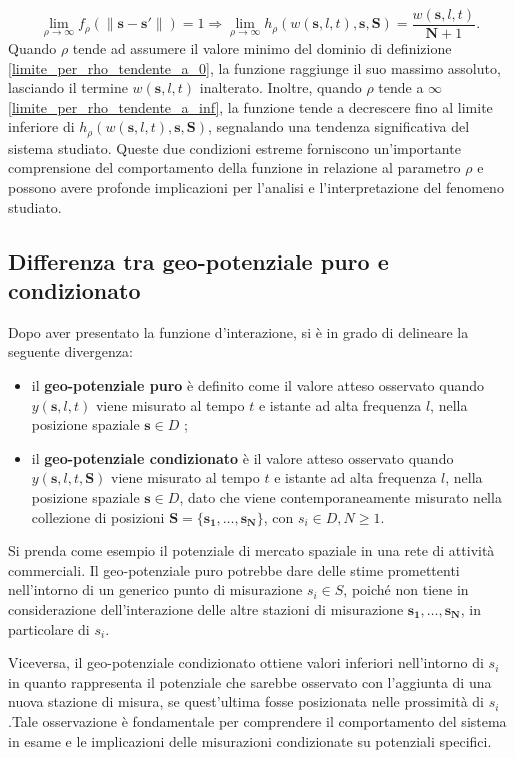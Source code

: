 \begin{equation}
	\lim_{\rho \to \infty} f_\rho(\|\mathbf{s} - \mathbf{s'}\|) = 1
	\Rightarrow \lim_{\rho \to \infty} h_\rho(w(\mathbf{s}, l, t), \mathbf{s}, \mathbf{S}) = \frac{w(\mathbf{s}, l, t)}{\mathbf{N} + 1} .
	\label{limite_per_rho_tendente_a_inf}
\end{equation}
Quando $\rho$ tende ad assumere il valore minimo del dominio di definizione \ref{limite_per_rho_tendente_a_0}, la funzione raggiunge il suo massimo assoluto, lasciando il termine $w(\mathbf{s}, l, t)$ inalterato. Inoltre, quando 
$\rho$ tende a $\infty$  \ref{limite_per_rho_tendente_a_inf}, la funzione tende a decrescere fino al limite inferiore di $h_\rho(w(\mathbf{s}, l, t), \mathbf{s}, \mathbf{S})$, segnalando una tendenza significativa del sistema studiato. Queste due condizioni estreme forniscono un'importante comprensione del comportamento della funzione in relazione al parametro $\rho$ e possono avere profonde implicazioni per l'analisi e l'interpretazione del fenomeno studiato.

\subsection[Differenza tra geo-potenziale puro e condizionato]{Differenza tra geo-potenziale puro e condizionato}
Dopo aver presentato la funzione d'interazione, si è in grado di delineare la seguente divergenza:
\begin{itemize}
	\item il \textbf{geo-potenziale puro} è definito come  il valore atteso osservato quando $y(\mathbf{s}, l, t)$ viene misurato al tempo $t$ e istante ad alta frequenza $l$, nella posizione spaziale $\mathbf{s} \in D$ ;
	\item il \textbf{geo-potenziale condizionato} è il valore atteso osservato quando $y(\mathbf{s}, l, t, \mathbf{S})$
	viene misurato al tempo $t$ e istante ad alta frequenza $l$, nella posizione spaziale $\mathbf{s} \in D$, dato che viene contemporaneamente misurato nella collezione di posizioni $\mathbf{S} = \{\mathbf{s_1}, \ldots, \mathbf{s_N}\}$,  con $s_i \in D, N \geq 1$.
\end{itemize}
	Si prenda come esempio il potenziale di mercato spaziale in  una rete di attività commerciali. Il geo-potenziale puro potrebbe dare delle stime promettenti nell'intorno di un generico punto di misurazione $s_i \in S$, poiché non tiene in considerazione dell'interazione delle altre stazioni di misurazione $\mathbf{s_1}, \ldots, \mathbf{s_N}$, in particolare di $s_i$.
	\par Viceversa, il geo-potenziale condizionato ottiene valori inferiori nell'intorno di $s_i$ in quanto rappresenta il potenziale che sarebbe osservato con l'aggiunta di una  nuova stazione di misura, se quest'ultima fosse posizionata nelle prossimità di $s_i$.Tale osservazione è fondamentale per comprendere il comportamento del sistema in esame e le implicazioni delle misurazioni condizionate su potenziali specifici.


